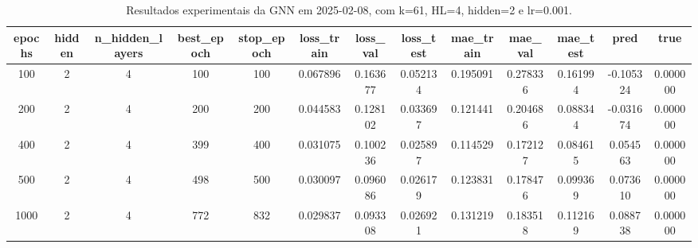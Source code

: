 \begin{table}[h]
\centering
\caption{Resultados experimentais da GNN em 2025-02-08, com k=61, HL=4, hidden=2 e lr=0.001.}
\label{tab:gnn_results_k61_hl4_h2_d20250208}
\begin{tabular}{ccccccccccccc}
\toprule
epochs & hidden & n\_hidden\_layers & best\_epoch & stop\_epoch & loss\_train & loss\_val & loss\_test & mae\_train & mae\_val & mae\_test & pred & true \\
\midrule
100 & 2 & 4 & 100 & 100 & 0.067896 & 0.163677 & 0.052134 & 0.195091 & 0.278336 & 0.161994 & -0.105324 & 0.000000 \\
200 & 2 & 4 & 200 & 200 & 0.044583 & 0.128102 & 0.033697 & 0.121441 & 0.204686 & 0.088344 & -0.031674 & 0.000000 \\
400 & 2 & 4 & 399 & 400 & 0.031075 & 0.100236 & 0.025897 & 0.114529 & 0.172127 & 0.084615 & 0.054563 & 0.000000 \\
500 & 2 & 4 & 498 & 500 & 0.030097 & 0.096086 & 0.026179 & 0.123831 & 0.178476 & 0.099369 & 0.073610 & 0.000000 \\
1000 & 2 & 4 & 772 & 832 & 0.029837 & 0.093308 & 0.026921 & 0.131219 & 0.183518 & 0.112169 & 0.088738 & 0.000000 \\
\bottomrule
\end{tabular}
\end{table}
